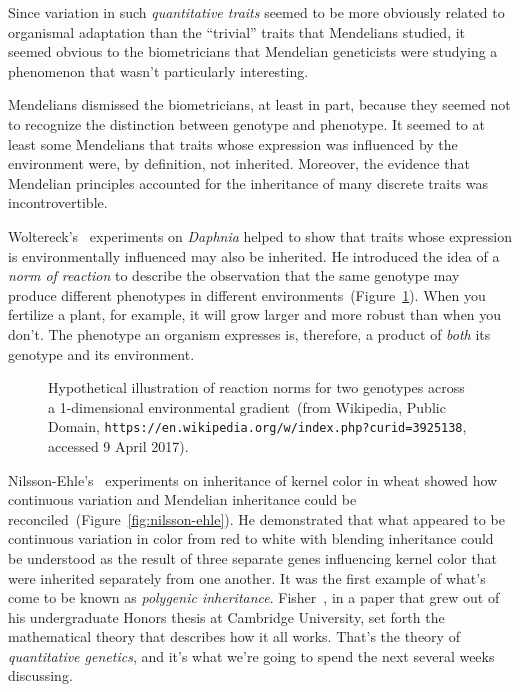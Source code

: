 \documentclass[12pt]{article}
\begin{document}
\noindent Since variation in such {\it quantitative traits\/} seemed
to be more obviously related to organismal adaptation than the
``trivial'' traits that Mendelians studied, it seemed obvious to the
biometricians that Mendelian geneticists were studying a phenomenon
that wasn't particularly interesting.

Mendelians dismissed the biometricians, at least in part, because they
seemed not to recognize the distinction between genotype and
phenotype. It seemed to at least some Mendelians that traits whose
expression was influenced by the environment were, by definition, not
inherited. Moreover, the evidence that Mendelian principles accounted
for the inheritance of many discrete traits was incontrovertible.

Woltereck's~\cite{Woltereck-1909} experiments on {\it Daphnia\/}
helped to show that traits whose expression is environmentally
influenced may also be inherited. He introduced the idea of a {\it
  norm of reaction} to describe the observation that the same genotype
may produce different phenotypes in different
environments~(Figure~\ref{fig:norm-of-reaction}). When you fertilize a
plant, for example, it will grow larger and more robust than when you
don't. The phenotype an organism expresses is, therefore, a product of
{\it both\/} its genotype and its environment.

\begin{figure}
\begin{center}
\end{center}
\caption{Hypothetical illustration of reaction norms for two genotypes
  across a 1-dimensional environmental gradient~(from Wikipedia,
  Public Domain,
  {\tt https://en.wikipedia.org/w/index.php?curid=3925138}, accessed 9
  April 2017).}\label{fig:norm-of-reaction}
\end{figure}

Nilsson-Ehle's~\cite{NilssonEhle-1909} experiments on inheritance of
kernel color in wheat showed how continuous variation and Mendelian
inheritance could be reconciled~(Figure~\ref{fig:nilsson-ehle}). He
demonstrated that what appeared to be continuous variation in color
from red to white with blending inheritance could be understood as the
result of three separate genes influencing kernel color that were
inherited separately from one another. It was the first example of
what's come to be known as {\it polygenic inheritance}. Fisher~\cite{Fisher-1918}, in a paper that grew out of
his undergraduate Honors thesis at Cambridge University, set forth the
mathematical theory that describes how it all works. That's the theory
of {\it quantitative genetics}, and it's what we're going to spend the
next several weeks discussing.
\end{document}
